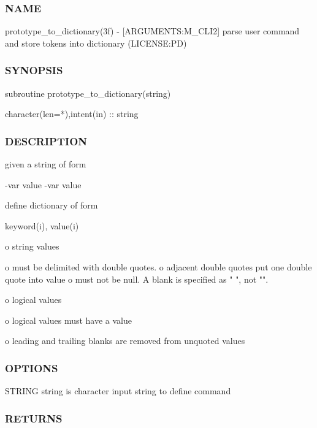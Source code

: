 \subsubsection*{N\+A\+ME}

prototype\+\_\+to\+\_\+dictionary(3f) -\/ \mbox{[}A\+R\+G\+U\+M\+E\+N\+TS\+:M\+\_\+\+C\+L\+I2\mbox{]} parse user command and store tokens into dictionary (L\+I\+C\+E\+N\+SE\+:PD) 

\subsubsection*{S\+Y\+N\+O\+P\+S\+IS}

\begin{DoxyVerb} subroutine prototype_to_dictionary(string)

  character(len=*),intent(in)     ::  string
\end{DoxyVerb}


\subsubsection*{D\+E\+S\+C\+R\+I\+P\+T\+I\+ON}

given a string of form

-\/var value -\/var value

define dictionary of form

keyword(i), value(i)

o string values \begin{DoxyVerb}o must be delimited with double quotes.
o adjacent double quotes put one double quote into value
o must not be null. A blank is specified as " ", not "".
\end{DoxyVerb}


o logical values \begin{DoxyVerb}o logical values must have a value
\end{DoxyVerb}


o leading and trailing blanks are removed from unquoted values

\subsubsection*{O\+P\+T\+I\+O\+NS}

S\+T\+R\+I\+NG string is character input string to define command

\subsubsection*{R\+E\+T\+U\+R\+NS}

